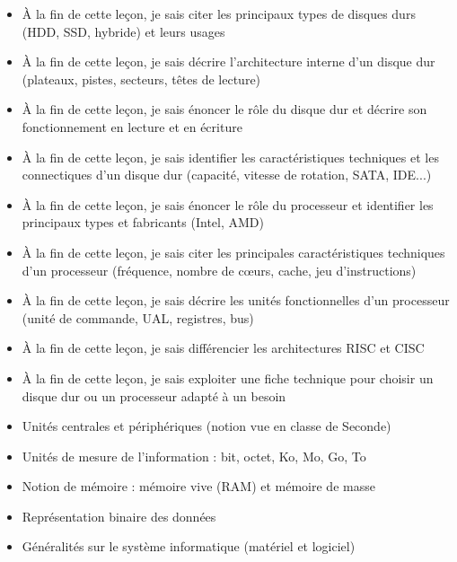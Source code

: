 \documentclass[11pt]{article}
\begin{document}
\begin{objectifs}
\begin{itemize}
\item À la fin de cette leçon, je sais citer les principaux types de disques durs (HDD, SSD, hybride) et leurs usages
\item À la fin de cette leçon, je sais décrire l'architecture interne d'un disque dur (plateaux, pistes, secteurs, têtes de lecture)
\item À la fin de cette leçon, je sais énoncer le rôle du disque dur et décrire son fonctionnement en lecture et en écriture
\item À la fin de cette leçon, je sais identifier les caractéristiques techniques et les connectiques d'un disque dur (capacité, vitesse de rotation, SATA, IDE...)
\item À la fin de cette leçon, je sais énoncer le rôle du processeur et identifier les principaux types et fabricants (Intel, AMD)
\item À la fin de cette leçon, je sais citer les principales caractéristiques techniques d'un processeur (fréquence, nombre de cœurs, cache, jeu d'instructions)
\item À la fin de cette leçon, je sais décrire les unités fonctionnelles d'un processeur (unité de commande, UAL, registres, bus)
\item À la fin de cette leçon, je sais différencier les architectures RISC et CISC
\item À la fin de cette leçon, je sais exploiter une fiche technique pour choisir un disque dur ou un processeur adapté à un besoin
\end{itemize}
\end{objectifs}

\begin{prerequis}
\begin{itemize}
\item Unités centrales et périphériques (notion vue en classe de Seconde)
\item Unités de mesure de l'information : bit, octet, Ko, Mo, Go, To
\item Notion de mémoire : mémoire vive (RAM) et mémoire de masse
\item Représentation binaire des données
\item Généralités sur le système informatique (matériel et logiciel)
\end{itemize}
\end{prerequis}

\newpage
\end{document}
